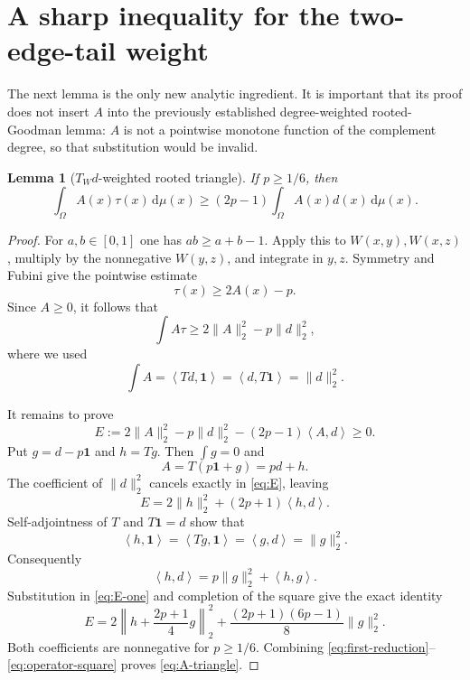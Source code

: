 \documentclass[11pt]{article}
\newtheorem{lemma}[theorem]{Lemma}
\newcommand{\dd}{\,\mathrm d}
\newcommand{\one}{\mathbf 1}
\newcommand{\ip}[2]{\left\langle #1,#2\right\rangle}
\begin{document}
\section{A sharp inequality for the two-edge-tail weight}

The next lemma is the only new analytic ingredient.  It is important that
its proof does not insert $A$ into the previously established
degree-weighted rooted-Goodman lemma: $A$ is not a pointwise monotone
function of the complement degree, so that substitution would be invalid.

\begin{lemma}[$T_Wd$-weighted rooted triangle]
\label{lem:A-triangle}
If $p\geq1/6$, then
\begin{equation}
 \int_\Omega A(x)\tau(x)\dd\mu(x)
 \geq(2p-1)\int_\Omega A(x)d(x)\dd\mu(x).
 \label{eq:A-triangle}
\end{equation}
\end{lemma}

\begin{proof}
For $a,b\in[0,1]$ one has $ab\geq a+b-1$.  Apply this to
$W(x,y),W(x,z)$, multiply by the nonnegative $W(y,z)$, and integrate in
$y,z$.  Symmetry and Fubini give the pointwise estimate
\begin{equation}
 \tau(x)\geq2A(x)-p.
 \label{eq:pointwise}
\end{equation}
Since $A\geq0$, it follows that
\begin{equation}
 \int A\tau\geq2\lVert A\rVert_2^2-p\lVert d\rVert_2^2,
 \label{eq:first-reduction}
\end{equation}
where we used
\[
 \int A=\ip{Td}{\one}=\ip{d}{T\one}=\lVert d\rVert_2^2.
\]

It remains to prove
\begin{equation}
 E:=2\lVert A\rVert_2^2-p\lVert d\rVert_2^2
 -(2p-1)\ip{A}{d}\geq0.
 \label{eq:E}
\end{equation}
Put $g=d-p\one$ and $h=Tg$.  Then $\int g=0$ and
\[
 A=T(p\one+g)=pd+h.
\]
The coefficient of $\lVert d\rVert_2^2$ cancels exactly in
\eqref{eq:E}, leaving
\begin{equation}
 E=2\lVert h\rVert_2^2+(2p+1)\ip{h}{d}.
 \label{eq:E-one}
\end{equation}
Self-adjointness of $T$ and $T\one=d$ show that
\[
 \ip{h}{\one}=\ip{Tg}{\one}=\ip{g}{d}=\lVert g\rVert_2^2.
\]
Consequently
\[
 \ip{h}{d}
 =p\lVert g\rVert_2^2+\ip{h}{g}.
\]
Substitution in \eqref{eq:E-one} and completion of the square give the
exact identity
\begin{equation}
 E=
 2\left\lVert h+\frac{2p+1}{4}g\right\rVert_2^2
 +\frac{(2p+1)(6p-1)}8\lVert g\rVert_2^2.
 \label{eq:operator-square}
\end{equation}
Both coefficients are nonnegative for $p\geq1/6$.  Combining
\eqref{eq:first-reduction}--\eqref{eq:operator-square} proves
\eqref{eq:A-triangle}.
\end{proof}
\end{document}
